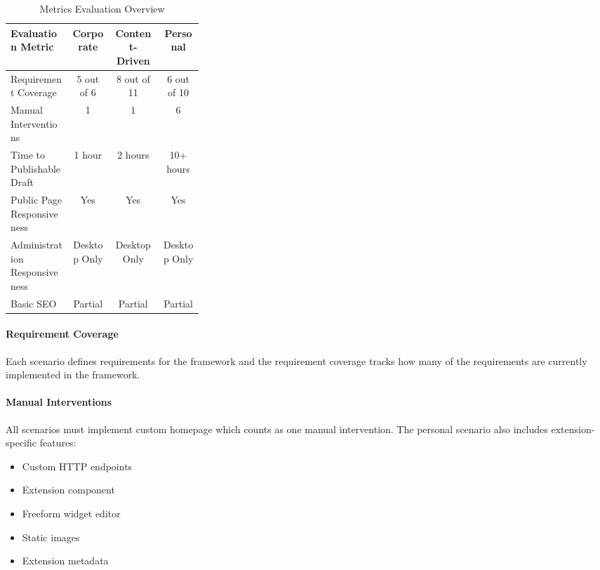 \begin{table}[H]
    \centering
    \begin{tabular}{|p{0.32\linewidth}|c|c|c|}
        \hline
        \textbf{Evaluation Metric}
        & \textbf{Corporate}
        & \textbf{Content-Driven}
        & \textbf{Personal}
        \\
        \hline
        Requirement Coverage
        & 5 out of 6
        & 8 out of 11
        & 6 out of 10
        \\
        \hline
        Manual Interventions
        & 1
        & 1
        & 6
        \\
        \hline
        Time to Publishable Draft
        & 1 hour
        & 2 hours
        & 10+ hours
        \\
        \hline
        Public Page Responsiveness
        & Yes
        & Yes
        & Yes
        \\
        \hline
        Administration Responsiveness
        & Desktop Only
        & Desktop Only
        & Desktop Only
        \\
        \hline
        Basic SEO
        & Partial
        & Partial
        & Partial
        \\
        \hline
    \end{tabular}
    \caption{Metrics Evaluation Overview}
    \label{tab:evaluationMetricsOverview}
\end{table}

\paragraph{Requirement Coverage}
Each scenario defines requirements for the framework and the requirement coverage tracks how many of the requirements
are currently implemented in the framework.

\paragraph{Manual Interventions}
All scenarios must implement custom homepage which counts as one manual intervention.
The personal scenario also includes extension-specific features:

\begin{itemize}
    \item Custom HTTP endpoints
    \item Extension component
    \item Freeform widget editor
    \item Static images
    \item Extension metadata
\end{itemize}

